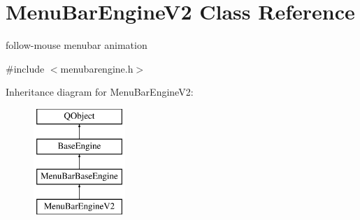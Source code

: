 \hypertarget{class_menu_bar_engine_v2}{}\section{Menu\+Bar\+Engine\+V2 Class Reference}
\label{class_menu_bar_engine_v2}


follow-\/mouse menubar animation  




{\ttfamily \#include $<$menubarengine.\+h$>$}

Inheritance diagram for Menu\+Bar\+Engine\+V2\+:\begin{figure}[H]
\begin{center}
\leavevmode
\includegraphics[height=4.000000cm]{class_menu_bar_engine_v2}
\end{center}
\end{figure}
